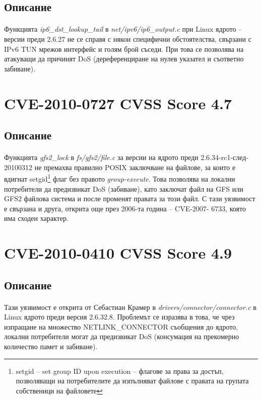 \documentclass[a4paper,12pt,leqno]{article}
\begin{document}
\subsection{Описание}
\paragraph{}
Функцията \textit{ip6\_dst\_lookup\_tail} в \textit{net/ipv6/ip6\_output.c} при Linux ядрото – версии 
преди 2.6.27 не се справя с някои специфични обстоятелства, свързани с IPv6 
TUN мрежов интерфейс и голям брой съседи. При това се позволява на 
атакуващи да причинят DoS (дереференциране на нулев указател и 
съответно забиване).


\section{CVE-2010-0727 CVSS Score 4.7}
\subsection{Описание}
\paragraph{}
Функцията \textit{gfs2\_lock} в \textit{fs/gfs2/file.c} за версии на ядрото преди 2.6.34-rc1-след-
20100312 не премахва правилно POSIX
 заключване на файлове, за които е 
вдигнат setgid\footnote{setgid – set group ID upon execution – флагове за права за достъп, позволяващи на 
потребителите да изпълняват файлове с правата на групата собственици на файловете}
 флаг без правото \textit{group-execute}. Това позволява на локални 
потребители да предизвикат DoS (забиване), като заключат файл на GFS или 
GFS2 файлова система и после променят правата за този файл. С тази 
уязвимост е свързана и друга, открита още през 2006-та година – CVE-2007-
6733, която има сходен характер.




\section{CVE-2010-0410 CVSS Score 4.9}
\subsection{Описание}
\paragraph{}
Тази уязвимост е открита от Себастиан Крамер
 в \textit{drivers/connector/connector.c }
в Linux ядрото преди версия 2.6.32.8. Проблемът се изразява в това, че чрез изпращане на множество NETLINK\_CONNECTOR съобщения до ядрото, локални 
потребители могат да предизвикат DoS (консумация на прекомерно 
количество памет и забиване).
\end{document}
